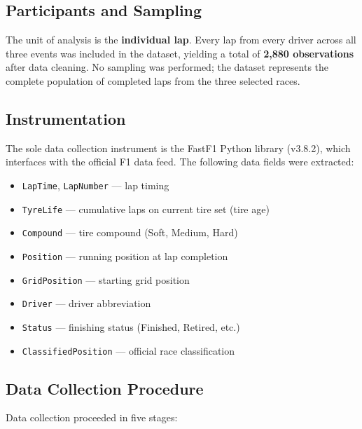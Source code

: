 \subsection{Participants and Sampling}

The unit of analysis is the \textbf{individual lap}. Every lap from every
driver across all three events was included in the dataset, yielding a total
of \textbf{2,880 observations} after data cleaning. No sampling was performed;
the dataset represents the complete population of completed laps from the three
selected races.

\subsection{Instrumentation}

The sole data collection instrument is the FastF1 Python library (v3.8.2),
which interfaces with the official F1 data feed. The following data fields
were extracted:

\begin{itemize}
  \item \texttt{LapTime}, \texttt{LapNumber} --- lap timing
  \item \texttt{TyreLife} --- cumulative laps on current tire set (tire age)
  \item \texttt{Compound} --- tire compound (Soft, Medium, Hard)
  \item \texttt{Position} --- running position at lap completion
  \item \texttt{GridPosition} --- starting grid position
  \item \texttt{Driver} --- driver abbreviation
  \item \texttt{Status} --- finishing status (Finished, Retired, etc.)
  \item \texttt{ClassifiedPosition} --- official race classification
\end{itemize}

\subsection{Data Collection Procedure}

Data collection proceeded in five stages:

